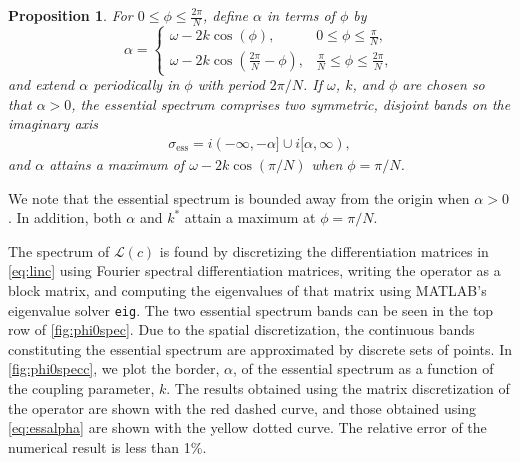 \documentclass[11pt,reqno]{amsart}
\def\calL{{\mathcal L}}
\newtheorem{proposition}{Proposition}
\begin{document}
\begin{proposition}\label{prop:ess}
For $0 \leq \phi \leq \frac{2\pi}{N}$, define $\alpha$ in terms of $\phi$ by 
\begin{equation}\label{eq:essalpha}
\alpha = \begin{cases}
\omega - 2 k \cos\left(\phi\right), & 0 \leq \phi \leq \frac{\pi}{N}, \\
\omega - 2 k \cos\left(\frac{2\pi}{N}-\phi\right), & \frac{\pi}{N} \leq \phi \leq \frac{2\pi}{N},
\end{cases}
\end{equation}
and extend $\alpha$ periodically in $\phi$ with period $2 \pi/N$. If $\omega$, $k$, and $\phi$ are chosen so that $\alpha > 0$, the essential spectrum comprises two symmetric, disjoint bands on the imaginary axis
\begin{align}\label{eq:lessinterval}
\sigma_{\text{ess}} = i (-\infty, -\alpha] \cup i [\alpha, \infty),
\end{align}
and $\alpha$ attains a maximum of $\omega - 2 k \cos\left(\pi/N\right)$ when $\phi = \pi/N$.
\end{proposition}
We note that the essential spectrum is bounded away from the origin when $\alpha>0$. In addition, both $\alpha$ and $k^*$ attain a maximum at $\phi = \pi/N$. 

The spectrum of $\calL(c)$ is found by discretizing the differentiation matrices in \cref{eq:linc} using Fourier spectral differentiation matrices, writing the operator as a block matrix, and computing the eigenvalues of that matrix using MATLAB's eigenvalue solver \texttt{eig}. 
The two essential spectrum bands can be seen in the top row of \cref{fig:phi0spec}.
Due to the spatial discretization, the continuous bands constituting the essential spectrum are approximated by discrete sets of points. In \cref{fig:phi0specc}, we plot the border, $\alpha$, of the essential spectrum as a function of the coupling parameter, $k$. The results obtained using the matrix discretization of the operator are shown with the red dashed curve, and those obtained using \cref{eq:essalpha} are shown with the yellow dotted curve. The relative error of the numerical result is less than 1\%. 
\end{document}

